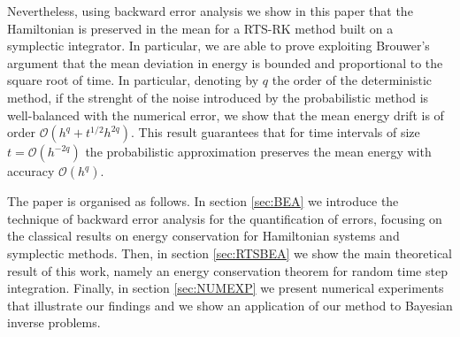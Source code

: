 \documentclass{siamart1116}
\numberwithin{theorem}{section}
\newcommand{\OO}{\mathcal{O}}
\begin{document}
Nevertheless, using backward error analysis we show in this paper that the Hamiltonian is preserved in the mean for a RTS-RK method built on a symplectic integrator. In particular, we are able to prove exploiting Brouwer's argument \cite{Bro37} that the mean deviation in energy is bounded and proportional to the square root of time. In particular, denoting by $q$ the order of the deterministic method, if the strenght of the noise introduced by the probabilistic method is well-balanced with the numerical error, we show that the mean energy drift is of order $\OO(h^q + t^{1/2}h^{2q})$. This result guarantees that for time intervals of size $t = \OO(h^{-2q})$ the probabilistic approximation preserves the mean energy with accuracy $\OO(h^q)$.

The paper is organised as follows. In section \ref{sec:BEA} we introduce the technique of backward error analysis for the quantification of errors, focusing on the classical results on energy conservation for Hamiltonian systems and symplectic methods. Then, in section \ref{sec:RTSBEA} we show the main theoretical result of this work, namely an energy conservation theorem for random time step integration. Finally, in section \ref{sec:NUMEXP} we present numerical experiments that illustrate our findings and we show an application of our method to Bayesian inverse problems.
\end{document}
